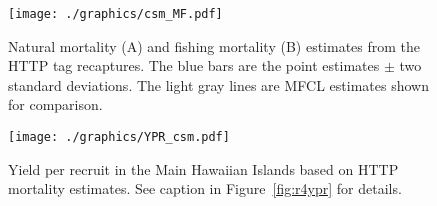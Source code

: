 \documentclass[12pt,letterpaper]{article}
\begin{document}
\begin{figure}
\begin{center}
\texttt{[image: ./graphics/csm\_MF.pdf]}
\caption{\label{fig:csmmf}
Natural mortality (A) and fishing mortality (B) estimates from the 
HTTP tag recaptures.
The blue bars are the point estimates $\pm$ two standard deviations.
The light gray lines are MFCL estimates shown for comparison.
}
\end{center}
\end{figure}

\begin{figure}
\begin{center}
\texttt{[image: ./graphics/YPR\_csm.pdf]}
\caption{\label{fig:yprcsm}
Yield per recruit in the Main Hawaiian Islands based on HTTP mortality
estimates. 
See caption in Figure~\ref{fig:r4ypr} for details.
}
\end{center}
\end{figure}
\end{document}
